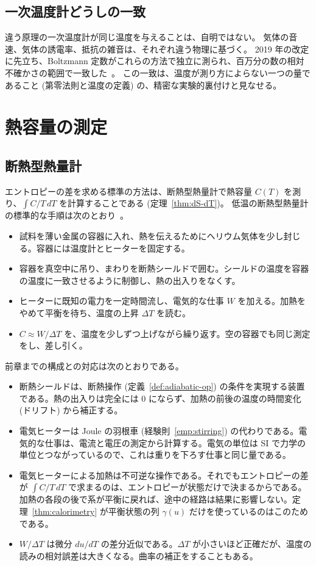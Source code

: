 \subsection{一次温度計どうしの一致}

違う原理の一次温度計が同じ温度を与えることは、自明ではない。
気体の音速、気体の誘電率、抵抗の雑音は、それぞれ違う物理に基づく。
2019 年の改定に先立ち、Boltzmann 定数がこれらの方法で独立に測られ、百万分の数の相対不確かさの範囲で一致した~\cite{Fischer2018, dePodesta2013}。
この一致は、温度が測り方によらない一つの量であること (第零法則と温度の定義) の、精密な実験的裏付けと見なせる。

\section{熱容量の測定}
\label{sec:measure-heat-capacity}

\subsection{断熱型熱量計}

エントロピーの差を求める標準の方法は、断熱型熱量計で熱容量 $C(T)$ を測り、$\int C/T\, dT$ を計算することである (定理~\ref{thm:dS-dT})。
低温の断熱型熱量計の標準的な手順は次のとおり~\cite{Westrum1968}。
\begin{itemize}
  \item 試料を薄い金属の容器に入れ、熱を伝えるためにヘリウム気体を少し封じる。容器には温度計とヒーターを固定する。
  \item 容器を真空中に吊り、まわりを断熱シールドで囲む。シールドの温度を容器の温度に一致させるように制御し、熱の出入りをなくす。
  \item ヒーターに既知の電力を一定時間流し、電気的な仕事 $W$ を加える。加熱をやめて平衡を待ち、温度の上昇 $\Delta T$ を読む。
  \item $C \approx W/\Delta T$ を、温度を少しずつ上げながら繰り返す。空の容器でも同じ測定をし、差し引く。
\end{itemize}

前章までの構成との対応は次のとおりである。
\begin{itemize}
  \item 断熱シールドは、断熱操作 (定義~\ref{def:adiabatic-op}) の条件を実現する装置である。熱の出入りは完全には $0$ にならず、加熱の前後の温度の時間変化 (ドリフト) から補正する。
  \item 電気ヒーターは Joule の羽根車 (経験則~\ref{emp:stirring}) の代わりである。電気的な仕事は、電流と電圧の測定から計算する。電気の単位は SI で力学の単位とつながっているので、これは重りを下ろす仕事と同じ量である。
  \item 電気ヒーターによる加熱は不可逆な操作である。それでもエントロピーの差が $\int C/T\, dT$ で求まるのは、エントロピーが状態だけで決まるからである。加熱の各段の後で系が平衡に戻れば、途中の経路は結果に影響しない。定理~\ref{thm:calorimetry} が平衡状態の列 $\gamma(u)$ だけを使っているのはこのためである。
  \item $W/\Delta T$ は微分 $du/dT$ の差分近似である。$\Delta T$ が小さいほど正確だが、温度の読みの相対誤差は大きくなる。曲率の補正をすることもある。
\end{itemize}

